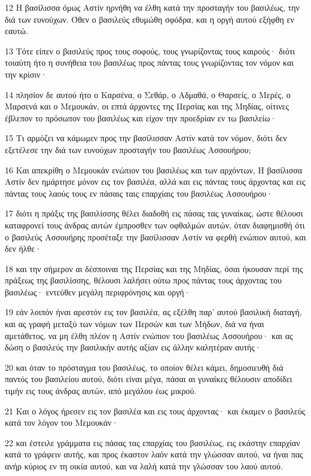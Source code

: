 \par 12 Η βασίλισσα όμως Αστίν ηρνήθη να έλθη κατά την προσταγήν του βασιλέως, την διά των ευνούχων. Όθεν ο βασιλεύς εθυμώθη σφόδρα, και η οργή αυτού εξήφθη εν εαυτώ.
\par 13 Τότε είπεν ο βασιλεύς προς τους σοφούς, τους γνωρίζοντας τους καιρούς· διότι τοιαύτη ήτο η συνήθεια του βασιλέως προς πάντας τους γνωρίζοντας τον νόμον και την κρίσιν·
\par 14 πλησίον δε αυτού ήτο ο Καρσένα, ο Σεθάρ, ο Αδμαθά, ο Θαρσείς, ο Μερές, ο Μαρσενά και ο Μεμουκάν, οι επτά άρχοντες της Περσίας και της Μηδίας, οίτινες έβλεπον το πρόσωπον του βασιλέως και είχον την προεδρίαν εν τω βασιλείω·
\par 15 Τι αρμόζει να κάμωμεν προς την βασίλισσαν Αστίν κατά τον νόμον, διότι δεν εξετέλεσε την διά των ευνούχων προσταγήν του βασιλέως Ασσουήρου;
\par 16 Και απεκρίθη ο Μεμουκάν ενώπιον του βασιλέως και των αρχόντων, Η βασίλισσα Αστίν δεν ημάρτησε μόνον εις τον βασιλέα, αλλά και εις πάντας τους άρχοντας και εις πάντας τους λαούς τους εν πάσαις ταις επαρχίαις του βασιλέως Ασσουήρου·
\par 17 διότι η πράξις της βασιλίσσης θέλει διαδοθή εις πάσας τας γυναίκας, ώστε θέλουσι καταφρονεί τους άνδρας αυτών έμπροσθεν των οφθαλμών αυτών, όταν διαφημισθή ότι ο βασιλεύς Ασσουήρης προσέταξε την βασίλισσαν Αστίν να φερθή ενώπιον αυτού, και δεν ήλθε·
\par 18 και την σήμερον αι δέσποιναι της Περσίας και της Μηδίας, όσαι ήκουσαν περί της πράξεως της βασιλίσσης, θέλουσι λαλήσει ούτω προς πάντας τους άρχοντας του βασιλέως· εντεύθεν μεγάλη περιφρόνησις και οργή·
\par 19 εάν λοιπόν ήναι αρεστόν εις τον βασιλέα, ας εξέλθη παρ' αυτού βασιλική διαταγή, και ας γραφή μεταξύ των νόμων των Περσών και των Μήδων, διά να ήναι αμετάθετος, να μη έλθη πλέον η Αστίν ενώπιον του βασιλέως Ασσουήρου· και ας δώση ο βασιλεύς την βασιλικήν αυτής αξίαν εις άλλην καλητέραν αυτής·
\par 20 και όταν το πρόσταγμα του βασιλέως, το οποίον θέλει κάμει, δημοσιευθή διά παντός του βασιλείου αυτού, διότι είναι μέγα, πάσαι αι γυναίκες θέλουσιν αποδίδει τιμήν εις τους άνδρας αυτών, από μεγάλου έως μικρού.
\par 21 Και ο λόγος ήρεσεν εις τον βασιλέα και εις τους άρχοντας· και έκαμεν ο βασιλεύς κατά τον λόγον του Μεμουκάν·
\par 22 και έστειλε γράμματα εις πάσας τας επαρχίας του βασιλέως, εις εκάστην επαρχίαν κατά το γράφειν αυτής, και προς έκαστον λαόν κατά την γλώσσαν αυτού, να ήναι πας ανήρ κύριος εν τη οικία αυτού, και να λαλή κατά την γλώσσαν του λαού αυτού.

